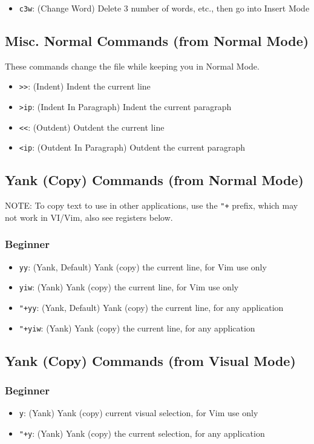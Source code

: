 \documentclass[11pt]{article}
\begin{document}
\begin{itemize}
\item \texttt{c3w}: (Change Word) Delete 3 number of words, etc., then go into Insert Mode
\end{itemize}
\subsection{Misc. Normal Commands (from Normal Mode)}
\label{sec:orge312397}
These commands change the file while keeping you in Normal Mode.
\begin{itemize}
\item \texttt{>>}: (Indent) Indent the current line
\item \texttt{>ip}: (Indent In Paragraph) Indent the current paragraph
\item \texttt{<<}: (Outdent) Outdent the current line
\item \texttt{<ip}: (Outdent In Paragraph) Outdent the current paragraph
\end{itemize}
\subsection{Yank (Copy) Commands (from Normal Mode)}
\label{sec:orgf840c5d}
NOTE: To copy text to use in other applications, use the \texttt{"+} prefix, which may
not work in VI/Vim, also see registers below.
\subsubsection{Beginner}
\label{sec:org5bd3a5c}
\begin{itemize}
\item \texttt{yy}: (Yank, Default) Yank (copy) the current line, for Vim use only
\item \texttt{yiw}: (Yank) Yank (copy) the current line, for Vim use only
\item \texttt{"+yy}: (Yank, Default) Yank (copy) the current line, for any application
\item \texttt{"+yiw}: (Yank) Yank (copy) the current line, for any application
\end{itemize}
\subsection{Yank (Copy) Commands (from Visual Mode)}
\label{sec:orge80091d}
\subsubsection{Beginner}
\label{sec:org995db3f}
\begin{itemize}
\item \texttt{y}: (Yank) Yank (copy) current visual selection, for Vim use only
\item \texttt{"+y}: (Yank) Yank (copy) the current selection, for any application
\end{itemize}
\end{document}
